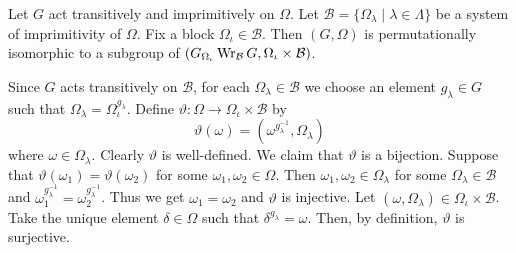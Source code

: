 \begin{theorem} \label{thm-embedding}
	Let $G$ act transitively and imprimitively on $\Omega$. Let $\mathcal{B} = \{\Omega_\lambda\mid \lambda\in\Lambda\}$ be a system of imprimitivity of $\Omega$. Fix a block $\Omega_\iota \in\mathcal{B}$. Then $(G,\Omega)$ is permutationally isomorphic to a subgroup of $(G_{\Omega_\iota} \operatorname{Wr}_\mathcal{B} G, \Omega_\iota\times \mathcal{B})$.
\end{theorem}
\begin{sketch}
	Since $G$ acts transitively on $\mathcal{B}$, for each $\Omega_\lambda\in \mathcal{B}$ we choose an element $g_\lambda\in G$ such that $\Omega_\lambda = \Omega_\iota^{g_{\lambda}}$. Define $\vartheta: \Omega \to \Omega_\iota \times \mathcal{B}$ by
	\begin{equation*}
		\vartheta(\omega) = (\omega^{g_{\lambda}^{-1}},\Omega_\lambda) 
	\end{equation*}
	where $\omega \in \Omega_\lambda$. Clearly $\vartheta$ is well-defined. We claim that $\vartheta$ is a bijection. Suppose that $\vartheta(\omega_1) = \vartheta(\omega_2)$ for some $\omega_1,\omega_2\in\Omega$. Then $\omega_1,\omega_2\in \Omega_\lambda$ for some $\Omega_\lambda\in\mathcal{B}$ and $\omega_1^{g_{\lambda}^{-1}}=\omega_2^{g_{\lambda}^{-1}}$. Thus we get $\omega_1 = \omega_2$ and $\vartheta$ is injective. Let $(\omega,\Omega_\lambda)\in \Omega_\iota \times \mathcal{B}$. Take the unique element $\delta\in \Omega$ such that $\delta^{g_\lambda} = \omega$. Then, by definition, $\vartheta$ is surjective.
	

\end{sketch}
